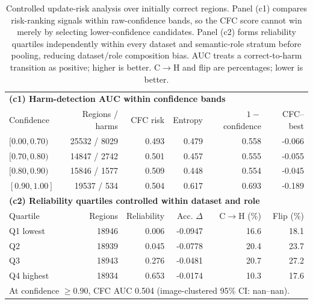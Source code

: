 \begin{table}[t]
\centering
\small
\caption{Controlled update-risk analysis over initially correct regions. Panel (c1) compares risk-ranking signals within raw-confidence bands, so the CFC score cannot win merely by selecting lower-confidence candidates. Panel (c2) forms reliability quartiles independently within every dataset and semantic-role stratum before pooling, reducing dataset/role composition bias. AUC treats a correct-to-harm transition as positive; higher is better. C$\rightarrow$H and flip are percentages; lower is better.}
\label{tab:source-risk-expanded}
\begin{tabular}{lrrrrr}
\toprule
\multicolumn{6}{l}{\textbf{(c1) Harm-detection AUC within confidence bands}}\\
Confidence & Regions / harms & CFC risk & Entropy & $1-$confidence & CFC--best \\
\midrule
$[0.00,0.70)$ & 25532 / 8029 & 0.493 & 0.479 & 0.558 & -0.066 \\
$[0.70,0.80)$ & 14847 / 2742 & 0.501 & 0.457 & 0.555 & -0.055 \\
$[0.80,0.90)$ & 15846 / 1577 & 0.509 & 0.448 & 0.554 & -0.045 \\
$[0.90,1.00]$ & 19537 / 534 & 0.504 & 0.617 & 0.693 & -0.189 \\
\midrule
\multicolumn{6}{l}{\textbf{(c2) Reliability quartiles controlled within dataset and role}}\\
Quartile & Regions & Reliability & Acc. $\Delta$ & C$\rightarrow$H (\%) & Flip (\%) \\
\midrule
Q1 lowest & 18946 & 0.006 & -0.0947 & 16.6 & 18.1 \\
Q2 & 18939 & 0.045 & -0.0778 & 20.4 & 23.7 \\
Q3 & 18943 & 0.276 & -0.0481 & 20.7 & 27.2 \\
Q4 highest & 18934 & 0.653 & -0.0174 & 10.3 & 17.6 \\
\midrule
\multicolumn{6}{l}{\footnotesize At confidence $\geq0.90$, CFC AUC 0.504 (image-clustered 95\% CI: nan--nan).}\\
\bottomrule
\end{tabular}
\end{table}
